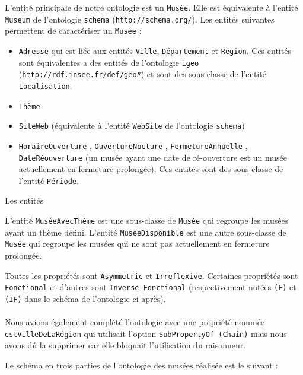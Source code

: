 \documentclass{article}
\begin{document}
L'entité principale de notre ontologie est un \texttt{Musée}. Elle est
équivalente à l'entité \texttt{Museum} de l'ontologie \texttt{schema}
(\texttt{http://schema.org/}). Les entités suivantes permettent de caractériser
un \texttt{Musée} : 
\begin{itemize}
  \item \texttt{Adresse} qui est liée aux entités \texttt{Ville},
\texttt{Département} et \texttt{Région}. Ces entités sont
équivalentes a des entités de l'ontologie \texttt{igeo}
(\texttt{http://rdf.insee.fr/def/geo\#}) et sont des sous-classe de l'entité
\texttt{Localisation}.
  \item \texttt{Thème}
  \item \texttt{SiteWeb} (équivalente à
l'entité \texttt{WebSite} de l'ontologie \texttt{schema})
\item \texttt{HoraireOuverture} , \texttt{OuvertureNocture}
, \texttt{FermetureAnnuelle} , \texttt{DateRéouverture} (un musée ayant une date
de ré-ouverture est un musée actuellement en fermeture prolongée). Ces entités
sont des sous-classe de l'entité \texttt{Période}.
\end{itemize}
Les entités 

\vspace{0.3cm}

L'entité \texttt{MuséeAvecThème} est une sous-classe de \texttt{Musée} qui
regroupe les musées ayant un thème défini. L'entité \texttt{MuséeDisponible} est
une autre sous-classe de \texttt{Musée} qui regroupe les musées qui ne sont
pas actuellement en fermeture prolongée.

\vspace{0.3cm}

Toutes les propriétés sont \texttt{Asymmetric} et \texttt{Irreflexive}.
Certaines propriétés sont \texttt{Fonctional} et d'autres sont
\texttt{Inverse Fonctional} (respectivement notées \texttt{(F)} et \texttt{(IF)}
dans le schéma de l'ontologie ci-après).

\paragraph{\starredbullet} Nous avions également complété l'ontologie avec une
propriété nommée \texttt{estVilleDeLaRégion} qui utilisait l'option
\texttt{SubPropertyOf (Chain)} mais nous avons dû la supprimer car elle
bloquait l'utilisation du raisonneur.

\newpage

Le schéma en trois parties de l'ontologie des musées réalisée est le suivant :
\end{document}
